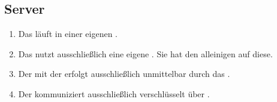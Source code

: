 \subsection{Server}

\begin{enumerate}
    \item Das %
        läuft in einer eigenen %
        .
    \item Das %
        nutzt ausschließlich eine eigene %
        . Sie hat den alleinigen %
        auf diese.
    \item Der %
        mit der %
        erfolgt ausschließlich unmittelbar durch das %
        .
    \item Der %
        kommuniziert ausschließlich verschlüsselt über %
        .
\end{enumerate}